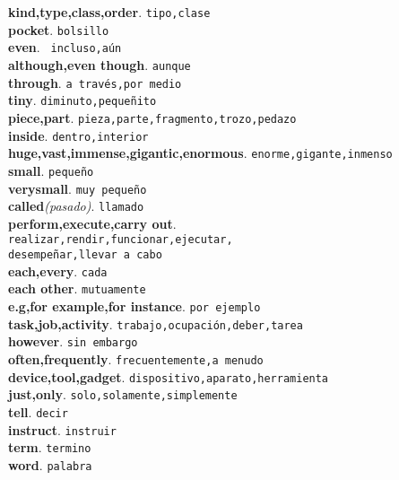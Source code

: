 \documentclass[twocolumn]{article}
\begin{document}
	\textsf{\textbf{kind,type,class,order}}. \texttt{tipo,clase}\\
	\textsf{\textbf{pocket}}. \texttt{bolsillo}\\
	\textsf{\textbf{even}}. \texttt{ incluso,a\'un}\\
	\textsf{\textbf{although,even though}}. \texttt{aunque}\\ 
	\textsf{\textbf{through}}. \texttt{a trav\'es,por medio}\\  
	\textsf{\textbf{tiny}}. \texttt{diminuto,peque\~nito}\\ 
	\textsf{\textbf{piece,part}}. \texttt{pieza,parte,fragmento,trozo,pedazo}\\
	\textsf{\textbf{inside}}. \texttt{dentro,interior}\\
	\textsf{\textbf{huge,vast,immense,gigantic,enormous}}. \texttt{enorme,gigante,inmenso}\\
	\textsf{\textbf{small}}. \texttt{peque\~no}\\
	\textsf{\textbf{verysmall}}. \texttt{muy peque\~no}\\
	\textsf{\textbf{called}{\scriptsize \textit{(pasado)}}}. \texttt{llamado}\\
	\textsf{\textbf{perform,execute,carry out}}.\\\texttt{realizar,rendir,funcionar,ejecutar,\\desempe\~nar,llevar a cabo}\\
	\textsf{\textbf{each,every}}. \texttt{cada}\\
	\textsf{\textbf{each other}}. \texttt{mutuamente}\\
	\textsf{\textbf{e.g,for example,for instance}}. \texttt{por ejemplo}\\
	\textsf{\textbf{task,job,activity}}. \texttt{trabajo,ocupaci\'on,deber,tarea}\\
	\textsf{\textbf{however}}. \texttt{sin embargo}\\
	\textsf{\textbf{often,frequently}}. \texttt{frecuentemente,a menudo}\\
	\textsf{\textbf{device,tool,gadget}}. \texttt{dispositivo,aparato,herramienta}\\
	\textsf{\textbf{just,only}}. \texttt{solo,solamente,simplemente}\\
	\textsf{\textbf{tell}}. \texttt{decir}\\
	\textsf{\textbf{instruct}}. \texttt{instruir}\\
	\textsf{\textbf{term}}. \texttt{termino}\\
	\textsf{\textbf{word}}. \texttt{palabra}\\
\end{document}
